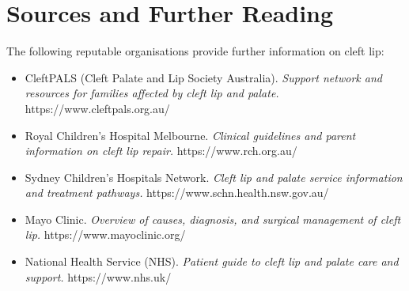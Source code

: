 \section*{Sources and Further Reading}
The following reputable organisations provide further information on cleft lip:
\begin{itemize}
    \item CleftPALS (Cleft Palate and Lip Society Australia). \textit{Support network and resources for families affected by cleft lip and palate.} https://www.cleftpals.org.au/
    \item Royal Children's Hospital Melbourne. \textit{Clinical guidelines and parent information on cleft lip repair.} https://www.rch.org.au/
    \item Sydney Children's Hospitals Network. \textit{Cleft lip and palate service information and treatment pathways.} https://www.schn.health.nsw.gov.au/
    \item Mayo Clinic. \textit{Overview of causes, diagnosis, and surgical management of cleft lip.} https://www.mayoclinic.org/
    \item National Health Service (NHS). \textit{Patient guide to cleft lip and palate care and support.} https://www.nhs.uk/
\end{itemize}
